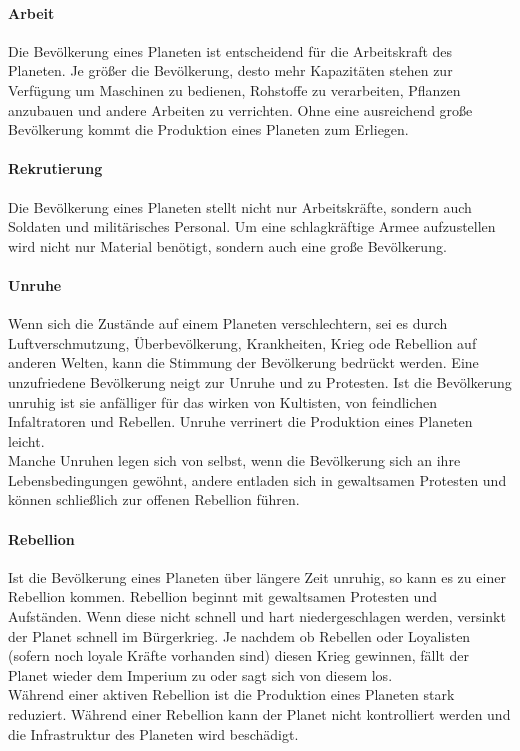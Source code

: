 \documentclass[11pt, a4paper]{article}
\begin{document}
\paragraph{Arbeit}
Die Bevölkerung eines Planeten ist entscheidend für die Arbeitskraft des Planeten. Je größer die Bevölkerung,
desto mehr Kapazitäten stehen zur Verfügung um Maschinen zu bedienen, Rohstoffe zu verarbeiten, Pflanzen 
anzubauen und andere Arbeiten zu verrichten. Ohne eine ausreichend große Bevölkerung kommt die Produktion
eines Planeten zum Erliegen.
%
\paragraph{Rekrutierung}
Die Bevölkerung eines Planeten stellt nicht nur Arbeitskräfte, sondern auch Soldaten und militärisches
Personal. Um eine schlagkräftige Armee aufzustellen wird nicht nur Material benötigt, sondern auch eine große 
Bevölkerung. 
%
\paragraph{Unruhe}
Wenn sich die Zustände auf einem Planeten verschlechtern, sei es durch Luftverschmutzung, Überbevölkerung,
Krankheiten, Krieg ode Rebellion auf anderen Welten, kann die Stimmung der Bevölkerung bedrückt werden.
Eine unzufriedene Bevölkerung neigt zur Unruhe und zu Protesten. Ist die Bevölkerung unruhig ist sie anfälliger
für das wirken von Kultisten, von feindlichen Infaltratoren und Rebellen. Unruhe verrinert die Produktion 
eines Planeten leicht.\\
Manche Unruhen legen sich von selbst, wenn die Bevölkerung sich an ihre Lebensbedingungen gewöhnt, andere 
entladen sich in gewaltsamen Protesten und können schließlich zur offenen Rebellion führen.
%
\paragraph{Rebellion}
Ist die Bevölkerung eines Planeten über längere Zeit unruhig, so kann es zu einer Rebellion kommen. Rebellion
beginnt mit gewaltsamen Protesten und Aufständen. Wenn diese nicht schnell und hart niedergeschlagen werden,
versinkt der Planet schnell im Bürgerkrieg. Je nachdem ob Rebellen oder Loyalisten (sofern noch loyale Kräfte
vorhanden sind) diesen Krieg gewinnen, fällt der Planet wieder dem Imperium zu oder sagt sich von diesem los.\\
Während einer aktiven Rebellion ist die Produktion eines Planeten stark reduziert. Während einer Rebellion kann
der Planet nicht kontrolliert werden und die Infrastruktur des Planeten wird beschädigt.\\
%
\end{document}
